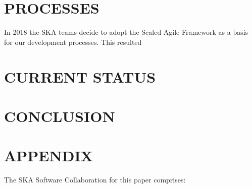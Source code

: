 \documentclass[a4paper,
               biblatex,     %
               keeplastbox,   %
               ]{jacow}
\begin{document}
\section{PROCESSES}
In 2018 the SKA teams decide to adopt the Scaled Agile Framework as a basis for our development processes. This resulted 


\section{CURRENT STATUS}


\section{CONCLUSION}



\section{APPENDIX}
The SKA Software Collaboration for this paper comprises:
\end{document}
